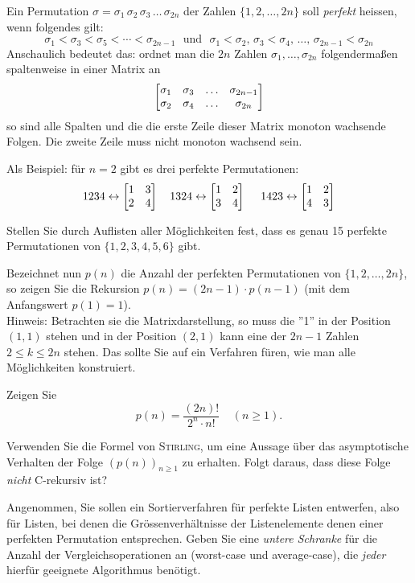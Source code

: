 Ein Permutation $\sigma=\sigma_1\,\sigma_2\, \sigma_3\,\ldots \,\sigma_{2n}$ der Zahlen
$\{1,2,\ldots,2n\}$ soll \emph{perfekt} heissen, wenn folgendes gilt:
\[
\sigma_1 < \sigma_3 < \sigma_5 < \cdots < \sigma_{2n-1}~~~\text{und}~~~
\sigma_1 < \sigma_2, \, \sigma_3 < \sigma_4 , \,   \ldots , \, \sigma_{2n-1} < \sigma_{2n}
\]
Anschaulich bedeutet das: ordnet man die $2n$ Zahlen $\sigma_1, \ldots,\sigma_{2n}$
folgenderma\ss en spaltenweise in einer Matrix an
\[
\begin{bmatrix}
\sigma_1 & \sigma_3 & \ldots & \sigma_{2n-1} \cr
\sigma_2 & \sigma_4 & \ldots & \sigma_{2n}
\end{bmatrix}
\] 
so sind alle Spalten und die die erste Zeile dieser Matrix monoton wachsende Folgen.
Die zweite Zeile muss nicht monoton wachsend sein.

Als Beispiel: für $n=2$ gibt es drei perfekte Permutationen:
\[
1234 \leftrightarrow \begin{bmatrix} 1 & 3 \cr 2 & 4 \end{bmatrix} ~~~
1324\leftrightarrow \begin{bmatrix} 1 & 2 \cr 3 & 4 \end{bmatrix} ~~~~
 1423\leftrightarrow\begin{bmatrix} 1 & 2 \cr 4 & 3 \end{bmatrix} 
\]

\begin{flushenum}
\item Stellen Sie durch Auflisten aller Möglichkeiten fest, dass es genau 15 perfekte Permutationen 
	von $\{1,2,3,4,5,6\}$ gibt.
\item Bezeichnet nun $p(n)$ die Anzahl der perfekten Permutationen von $\{1,2,\ldots,2n\}$,
	so zeigen Sie die Rekursion $p(n)= (2n-1)\cdot p(n-1)$ (mit dem Anfangswert $p(1)=1$).\\
	Hinweis: Betrachten sie die Matrixdarstellung, so muss die ''1''   in der Position $(1,1)$ stehen
	und in der Position $(2,1)$ kann eine der $2n-1$ Zahlen $2 \leq k \leq 2n$ stehen. Das sollte
	Sie auf ein Verfahren füren, wie man alle Möglichkeiten konstruiert.
\item Zeigen Sie
	\[
	p(n) = \frac{(2n)!}{2^n \cdot n!}~~~~~(n \geq 1).
	\]
\item Verwenden Sie die Formel von \textsc{Stirling}, um eine Aussage über das
	asymptotische Verhalten der Folge $(p(n))_{n  \geq 1}$ zu erhalten. Folgt daraus,
	dass diese Folge \emph{nicht} C-rekursiv ist?
\item Angenommen, Sie sollen ein Sortierverfahren für perfekte Listen entwerfen, also für 
	Listen, bei denen die Grössenverhältnisse der Listenelemente denen einer perfekten
	Permutation entsprechen. Geben Sie eine \emph{untere Schranke} für die
	Anzahl der Vergleichsoperationen an (worst-case und average-case), die \emph{jeder}
	hierfür geeignete Algorithmus benötigt.
\end{flushenum}

